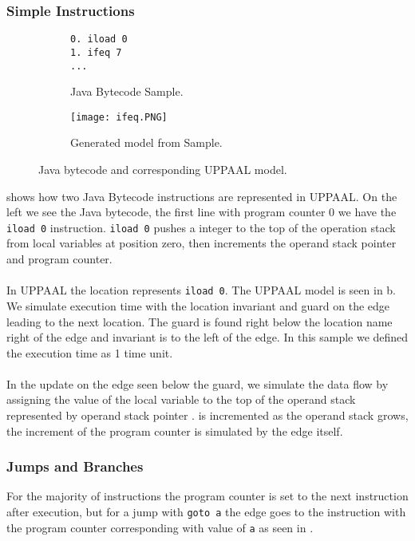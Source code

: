 \subsubsection{Simple Instructions}
\begin{figure}[H]
\centering
\begin{subfigure}{.3\textwidth}
  \begin{lstlisting}
0. iload 0
1. ifeq 7
...
  \end{lstlisting}
  \caption{Java Bytecode Sample.}
\end{subfigure} 
\hspace{10px}
\begin{subfigure}{.6\textwidth}
  \texttt{[image: ifeq.PNG]}
  \caption{Generated model from Sample.}
\end{subfigure}
\caption{Java bytecode and corresponding UPPAAL model.}
\label{fig:uppaal1}
\end{figure}

 shows how two Java Bytecode instructions are represented in UPPAAL. On the left we see the Java bytecode, the first line with program counter 0 we have the \texttt{iload 0} instruction. \texttt{iload 0} pushes a integer to the top of the operation stack from local variables at position zero, then increments the operand stack pointer and program counter.\\\\
In UPPAAL the location  represents \texttt{iload 0}. The UPPAAL model is seen in b. We simulate execution time with the location invariant  and guard  on the edge leading to the next location. The guard is found right below the location name right of the edge and invariant is to the left of the edge. In this sample we defined the execution time as 1 time unit.\\\\
In the update on the edge seen below the guard, we simulate the data flow by assigning the value of the local variable  to the top of the operand stack  represented by operand stack pointer .  is incremented as the operand stack grows, the increment of the program counter is simulated by the edge itself.

\subsubsection{Jumps and Branches}
For the majority of instructions the program counter is set to the next instruction after execution, but for a jump with \texttt{goto a} the edge goes to the instruction with the program counter corresponding with value of \texttt{a} as seen in .

